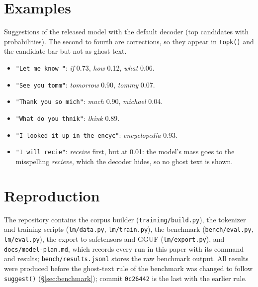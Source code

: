 \documentclass[11pt]{article}
\begin{document}
\section{Examples}

Suggestions of the released model with the default decoder (top candidates with probabilities). The second to
fourth are corrections, so they appear in \texttt{topk()} and the candidate bar but not as ghost text.
\begin{itemize}
  \item \texttt{"Let me know "}: \textit{if} 0.73, \textit{how} 0.12, \textit{what} 0.06.
  \item \texttt{"See you tomm"}: \textit{tomorrow} 0.90, \textit{tommy} 0.07.
  \item \texttt{"Thank you so mich"}: \textit{much} 0.90, \textit{michael} 0.04.
  \item \texttt{"What do you thnik"}: \textit{think} 0.89.
  \item \texttt{"I looked it up in the encyc"}: \textit{encyclopedia} 0.93.
  \item \texttt{"I will recie"}: \textit{receive} first, but at 0.01: the model's mass goes to the misspelling
  \textit{recieve}, which the decoder hides, so no ghost text is shown.
\end{itemize}

\section{Reproduction}

The repository contains the corpus builder (\texttt{training/build.py}), the tokenizer and training scripts
(\texttt{lm/data.py}, \texttt{lm/train.py}), the benchmark (\texttt{bench/eval.py}, \texttt{lm/eval.py}), the
export to safetensors and GGUF (\texttt{lm/export.py}), and \texttt{docs/model-plan.md}, which records every run
in this paper with its command and results; \texttt{bench/results.jsonl} stores the raw benchmark output. All
results were produced before the ghost-text rule of the benchmark was changed to follow \texttt{suggest()}
(\S\ref{sec:benchmark}); commit \texttt{0c26442} is the last with the earlier rule.
\end{document}
